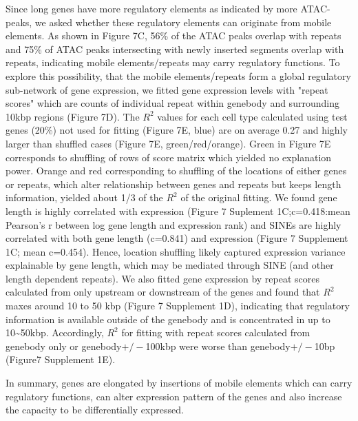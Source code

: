 Since long genes have more regulatory elements as indicated by more ATAC-peaks, we asked whether these regulatory elements can originate from mobile elements. As shown in Figure 7C, 56\% of the ATAC peaks overlap with repeats and 75\% of ATAC peaks intersecting with newly inserted segments overlap with repeats, indicating mobile elements/repeats may carry regulatory functions. To explore this possibility, that the mobile elements/repeats form a global regulatory sub-network of gene expression, we fitted gene expression levels with "repeat scores" which are counts of individual repeat within genebody and surrounding 10kbp regions (Figure 7D).  The $R^2$ values for each cell type calculated using test genes (20\%) not used for fitting (Figure 7E, blue) are on average 0.27 and highly larger than shuffled cases (Figure 7E, green/red/orange). Green in Figure 7E corresponds to shuffling of rows of score matrix which yielded no explanation power. Orange and red corresponding to shuffling of the locations of either genes or repeats, which alter relationship between genes and repeats but keeps length information, yielded about 1/3 of the $R^2$ of the original fitting. We found gene length is highly correlated with expression (Figure 7 Suplement 1C;c=0.418:mean Pearson's r between log gene length and expression rank) and SINEs are highly correlated with both gene length (c=0.841) and expression (Figure 7 Supplement 1C; mean c=0.454). Hence, location shuffling likely captured expression variance explainable by gene length, which may be mediated through SINE (and other length dependent repeats). We also fitted gene expression by repeat scores calculated from only upstream or downstream of the genes and found that $R^2$ maxes around 10 to 50 kbp (Figure 7 Supplement 1D), indicating that regulatory information is available outside of the genebody and is concentrated in up to 10\sim 50kbp. Accordingly, $R^2$ for fitting with repeat scores calculated from genebody only or genebody$+/-$100kbp were worse than genebody$+/-$10bp (Figure7 Supplement 1E). 

In summary, genes are elongated by insertions of mobile elements which can carry regulatory functions, can alter expression pattern of the genes and also increase the capacity to be differentially expressed. 


